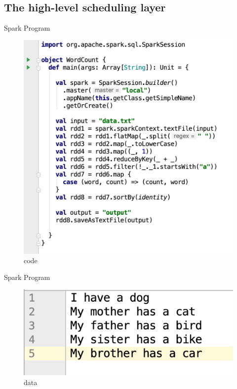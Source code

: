 \subsection{The high-level scheduling layer}
\begin{frame}[plain,t]{Spark Program} %
	 \\ 
	\begin{figure}
		\centering
		\includegraphics[width=0.65\linewidth]{images/p003}
		\caption{code}
		\label{fig:p003}
	\end{figure}
	
\end{frame}
\begin{frame}[plain,t]{Spark Program} %
	 \\  \vspace{2ex}
	\begin{figure}
		\centering
		\includegraphics[width=0.9\linewidth]{images/dag013}
		\caption{data}
		\label{fig:dag013}
	\end{figure}
	
\end{frame}
